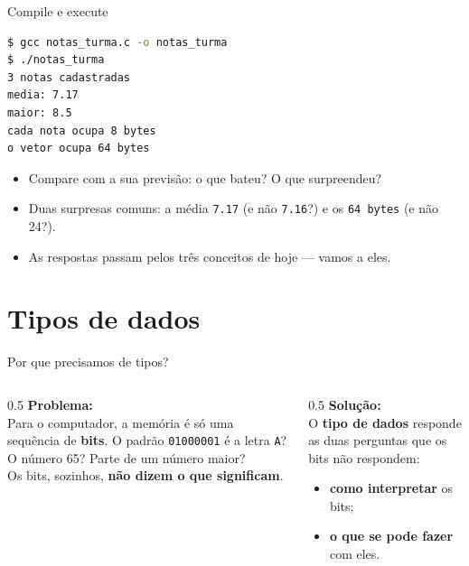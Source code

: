 \documentclass[aspectratio=169]{beamer}
\begin{document}
\begin{frame}[fragile]{Compile e execute}
\begin{lstlisting}[language=bash, numbers=none]
$ gcc notas_turma.c -o notas_turma
$ ./notas_turma
3 notas cadastradas
media: 7.17
maior: 8.5
cada nota ocupa 8 bytes
o vetor ocupa 64 bytes
\end{lstlisting}
  \begin{itemize}
    \item Compare com a sua previsão: o que bateu? O que surpreendeu?
    \item Duas surpresas comuns: a média \texttt{7.17} (e não \texttt{7.16}?)
      e os \texttt{64 bytes} (e não 24?).
    \item As respostas passam pelos três conceitos de hoje --- vamos a eles.
  \end{itemize}
\end{frame}

\section{Tipos de dados}

\begin{frame}{Por que precisamos de tipos?}
  \begin{columns}[T]
    \begin{column}{0.5\textwidth}
      \textbf{Problema:}\\[4pt]
      Para o computador, a memória é só uma sequência de \textbf{bits}.
      O padrão \texttt{01000001} é a letra \texttt{A}? O número 65? Parte de
      um número maior?\\[4pt]
      Os bits, sozinhos, \textbf{não dizem o que significam}.
    \end{column}
    \begin{column}{0.5\textwidth}
      \textbf{Solução:}\\[4pt]
      O \textbf{tipo de dados} responde as duas perguntas que os bits não
      respondem:
      \begin{itemize}
        \item \textbf{como interpretar} os bits;
        \item \textbf{o que se pode fazer} com eles.
      \end{itemize}
    \end{column}
  \end{columns}
\end{frame}
\end{document}
